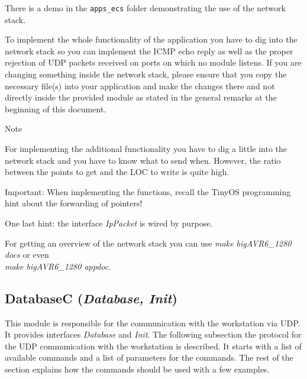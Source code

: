 \documentclass[a4paper,10pt]{article}
\newenvironment{note}[1][Note]{%
	\begin{bclogo}[noborder=true,logo=\bcinfo]{#1}
}
{\end{bclogo}}
\def\interface#1{{\em #1\/}}
\begin{document}
There is a demo in the \texttt{apps\_ecs} folder demonstrating the use of the
	network stack.

To implement the whole functionality of the application you have to dig into
	the network stack so you can implement the ICMP echo reply as well as the
	proper rejection of UDP packets received on ports on which no module
	listens.
If you are changing something inside the network stack, please ensure that you
	copy the necessary file(s) into your application and make the changes
	there and not directly inside the provided module as stated in the general
	remarks at the beginning of this document.


\begin{note}
	For implementing the additional functionality you have to dig
		a little into the network stack and you have to know what to send
		when.
	However, the ratio between the points to get and the LOC to write is quite
		high.

	Important: When implementing the functions, recall the TinyOS programming
		hint about the forwarding of pointers!

	One last hint: the interface \interface{IpPacket} is wired by purpose.
\end{note}

For getting  an overview of  the network stack  you can use \emph{make
	bigAVR6\_1280 docs} or even\\ \emph{make bigAVR6\_1280 appdoc}.


\subsection{DatabaseC (\interface{Database, Init})}
This module is responsible for the communication with the workstation
	via UDP.
It provides interfaces \interface{Database} and \interface{Init}.
The following subsection the protocol for the UDP communication with the workstation is described. It starts with a list of available commands and a list of parameters for the commands.
The rest of the section explains how the commands should be used with a few examples.

\end{document}
